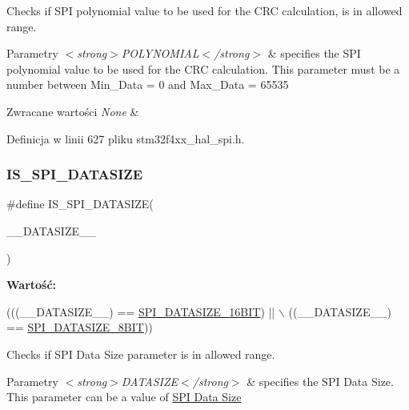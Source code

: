 Checks if S\+PI polynomial value to be used for the C\+RC calculation, is in allowed range. 


\begin{DoxyParams}{Parametry}
{\em $<$strong$>$\+P\+O\+L\+Y\+N\+O\+M\+I\+A\+L$<$/strong$>$} & specifies the S\+PI polynomial value to be used for the C\+RC calculation. This parameter must be a number between Min\+\_\+\+Data = 0 and Max\+\_\+\+Data = 65535 \\
\hline
\end{DoxyParams}

\begin{DoxyRetVals}{Zwracane wartości}
{\em None} & \\
\hline
\end{DoxyRetVals}


Definicja w linii 627 pliku stm32f4xx\+\_\+hal\+\_\+spi.\+h.

\mbox{\label{group___s_p_i___private___macros_gac04b1218a162772dca3854aa3a441856}} 
\subsubsection{\texorpdfstring{I\+S\+\_\+\+S\+P\+I\+\_\+\+D\+A\+T\+A\+S\+I\+ZE}{IS\_SPI\_DATASIZE}}
{\footnotesize\ttfamily \#define I\+S\+\_\+\+S\+P\+I\+\_\+\+D\+A\+T\+A\+S\+I\+ZE(\begin{DoxyParamCaption}\item[{}]{\+\_\+\+\_\+\+D\+A\+T\+A\+S\+I\+Z\+E\+\_\+\+\_\+ }\end{DoxyParamCaption})}

{\bfseries Wartość\+:}
\begin{DoxyCode}
(((\_\_DATASIZE\_\_) == \hyperlink{group___s_p_i___data___size_ga902147b9ead27cd9333240c72ce74f59}{SPI\_DATASIZE\_16BIT}) || \(\backslash\)
                                       ((\_\_DATASIZE\_\_) == \hyperlink{group___s_p_i___data___size_ga773e9fc5d44c9661c829361fbd073152}{SPI\_DATASIZE\_8BIT}))
\end{DoxyCode}


Checks if S\+PI Data Size parameter is in allowed range. 


\begin{DoxyParams}{Parametry}
{\em $<$strong$>$\+D\+A\+T\+A\+S\+I\+Z\+E$<$/strong$>$} & specifies the S\+PI Data Size. This parameter can be a value of \hyperlink{group___s_p_i___data___size}{S\+PI Data Size} \\
\hline
\end{DoxyParams}

